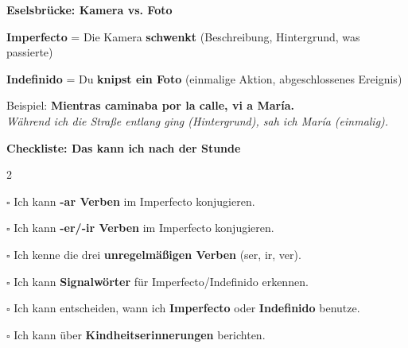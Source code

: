 \documentclass[11pt, a4paper]{article}
\newcommand{\seriftext}[1]{{\fontfamily{ppl}\selectfont #1}}
\newcommand{\es}[1]{\seriftext{\textbf{#1}}}
\newcommand{\de}[1]{\textit{\textcolor{akzent}{#1}}}
\begin{document}
\vspace{8pt}

\begin{grammatikbox}
\textbf{Eselsbrücke: Kamera vs. Foto}

\vspace{4pt}
\textbf{Imperfecto} = Die Kamera \textbf{schwenkt} (Beschreibung, Hintergrund, was passierte)

\textbf{Indefinido} = Du \textbf{knipst ein Foto} (einmalige Aktion, abgeschlossenes Ereignis)

\vspace{4pt}
{\small
Beispiel: \es{Mientras \textcolor{colorrojo}{caminaba} por la calle, \textcolor{colorazul}{vi} a María.}\\
\de{Während ich die Straße entlang ging (Hintergrund), sah ich María (einmalig).}}
\end{grammatikbox}

\vspace{8pt}


\begin{zusatzbox}
{\small\textbf{Checkliste: Das kann ich nach der Stunde}}

\vspace{4pt}
\begin{multicols}{2}
\footnotesize

$\square$ Ich kann \textbf{-ar Verben} im Imperfecto konjugieren.

$\square$ Ich kann \textbf{-er/-ir Verben} im Imperfecto konjugieren.

$\square$ Ich kenne die drei \textbf{unregelmäßigen Verben} (ser, ir, ver).

\columnbreak

$\square$ Ich kann \textbf{Signalwörter} für Imperfecto/Indefinido erkennen.

$\square$ Ich kann entscheiden, wann ich \textbf{Imperfecto} oder \textbf{Indefinido} benutze.

$\square$ Ich kann über \textbf{Kindheitserinnerungen} berichten.

\end{multicols}
\end{zusatzbox}
\end{document}
